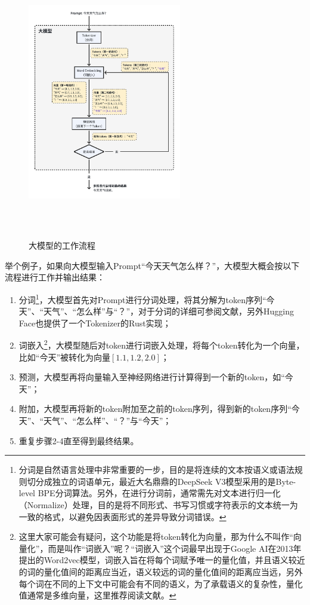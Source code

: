 \documentclass[letterpaper,11pt]{article}
\numberwithin{equation}{section}
\begin{document}
\begin{figure}[!htbp]
    \centering
    \includegraphics[width=0.6\textwidth, height=12cm, keepaspectratio]{../../assets/imgs/ai_share/llm_workflow.pdf}
    \caption{大模型的工作流程}
    \label{fig:llm-workflow}
\end{figure}

举个例子，如果向大模型输入Prompt“今天天气怎么样？”，大模型大概会按以下流程进行工作并输出结果：
\begin{enumerate}
    \item 分词\footnote{分词是自然语言处理中非常重要的一步，目的是将连续的文本按语义或语法规则切分成独立的词语单元，最近大名鼎鼎的DeepSeek V3模型采用的是Byte-level BPE分词算法。另外，在进行分词前，通常需先对文本进行归一化（Normalize）处理，目的是将不同形式、书写习惯或字符表示的文本统一为一致的格式，以避免因表面形式的差异导致分词错误。}，大模型首先对Prompt进行分词处理，将其分解为token序列“今天”、“天气”、“怎么样”与“？”，对于分词的详细可参阅文献\cite{glan2023tokenizer}，另外Hugging Face也提供了一个Tokenizer的Rust实现\cite{huggingface_tokenizers}；
    \item 词嵌入\footnote{这里大家可能会有疑问，这个功能是将token转化为向量，那为什么不叫作“向量化”，而是叫作“词嵌入”呢？“词嵌入”这个词最早出现于Google AI在2013年提出的Word2vec模型\cite{mikolov2013efficientestimationwordrepresentations}，词嵌入旨在将每个词赋予唯一的量化值，并且语义较近的词的量化值间的距离应当近，语义较远的词的量化值间的距离应当远，另外每个词在不同的上下文中可能会有不同的语义，为了承载语义的复杂性，量化值通常是多维向量，这里推荐阅读文献\cite{constantine2023wordembedding}。}，大模型随后对token进行词嵌入处理，将每个token转化为一个向量，比如“今天”被转化为向量$[1.1, 1.2, 2.0]$；
    \item 预测，大模型再将向量输入至神经网络进行计算得到一个新的token，如“今天”；
    \item 附加，大模型再将新的token附加至之前的token序列，得到新的token序列“今天”、“天气”、“怎么样”、“？”与“今天”；
    \item 重复步骤2-4直至得到最终结果。
\end{enumerate}

\printbibliography[title={引用}]
\end{document}
